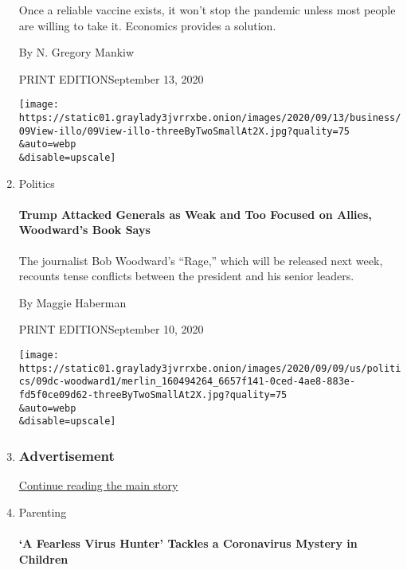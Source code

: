\begin{enumerate}
  Once a reliable vaccine exists, it won't stop the pandemic unless most
  people are willing to take it. Economics provides a solution.

  By N. Gregory Mankiw

  PRINT EDITIONSeptember 13, 2020

  \texttt{[image: https://static01.graylady3jvrrxbe.onion/images/2020/09/13/business/09View-illo/09View-illo-threeByTwoSmallAt2X.jpg?quality=75\\\&auto=webp\\\&disable=upscale]}
\item
  Politics

  \href{/2020/09/09/us/politics/trump-generals-attacks.html?searchResultPosition=4}{}

  \hypertarget{trump-attacked-generals-as-weak-and-too-focused-on-allies-woodwards-book-says}{%
  \paragraph{Trump Attacked Generals as Weak and Too Focused on Allies,
  Woodward's Book
  Says}\label{trump-attacked-generals-as-weak-and-too-focused-on-allies-woodwards-book-says}}

  The journalist Bob Woodward's ``Rage,'' which will be released next
  week, recounts tense conflicts between the president and his senior
  leaders.

  By Maggie Haberman

  PRINT EDITIONSeptember 10, 2020

  \texttt{[image: https://static01.graylady3jvrrxbe.onion/images/2020/09/09/us/politics/09dc-woodward1/merlin\_160494264\_6657f141-0ced-4ae8-883e-fd5f0ce09d62-threeByTwoSmallAt2X.jpg?quality=75\\\&auto=webp\\\&disable=upscale]}
\item
  \hypertarget{advertisement}{%
  \subsubsection{Advertisement}\label{advertisement}}

  \protect\hyperlink{after-mid140}{Continue reading the main story}
\item
  Parenting

  \href{/2020/09/09/parenting/children-coronavirus-sickness.html?searchResultPosition=5}{}

  \hypertarget{a-fearless-virus-hunter-tackles-a-coronavirus-mystery-in-children}{%
  \paragraph{`A Fearless Virus Hunter' Tackles a Coronavirus Mystery in
  Children}\label{a-fearless-virus-hunter-tackles-a-coronavirus-mystery-in-children}}


\end{enumerate}
